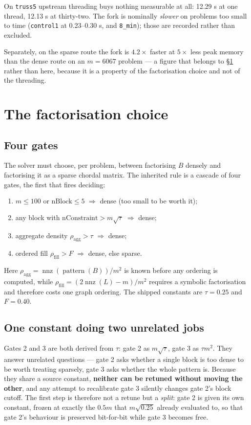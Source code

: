 \documentclass[11pt]{article}
\newcommand{\aggr}{\rho_{\mathrm{agg}}}
\newcommand{\rfill}{\rho_{\mathrm{fill}}}
\newcommand{\bMat}{B}
\newcommand{\code}[1]{\texttt{#1}}
\begin{document}
On \code{truss5} upstream threading buys nothing measurable at all: 12.29 s at one thread, 12.13 s
at thirty-two. The fork is nominally \emph{slower} on problems too small to time
(\code{control1} at 0.23--0.30 s, and \code{8\_min}); those are recorded rather than excluded.

Separately, on the sparse route the fork is $4.2\times$ faster at $5\times$ less peak memory than
the dense route on an $m=6067$ problem --- a figure that belongs to \S\ref{sec:chooser} rather than here, because
it is a property of the factorisation choice and not of the threading.

\section{The factorisation choice}
\label{sec:chooser}

\subsection{Four gates}

The solver must choose, per problem, between factorising $\bMat$ densely and factorising it as a
sparse chordal matrix. The inherited rule is a cascade of four gates, the first that fires
deciding:

\begin{enumerate}
  \item $m \le 100$ or $\text{nBlock} \le 5$ $\Rightarrow$ dense (too small to be worth it);
  \item any block with $\text{nConstraint} > m\sqrt{\tau}$ $\Rightarrow$ dense;
  \item aggregate density $\aggr > \tau$ $\Rightarrow$ dense;
  \item ordered fill $\rfill > F$ $\Rightarrow$ dense, else sparse.
\end{enumerate}

Here $\aggr = \operatorname{nnz}(\operatorname{pattern}(\bMat))/m^{2}$ is known before any
ordering is computed, while $\rfill = (2\operatorname{nnz}(L) - m)/m^{2}$ requires a symbolic
factorisation and therefore costs one graph ordering. The shipped constants are $\tau = 0.25$
and $F = 0.40$.

\subsection{One constant doing two unrelated jobs}

Gates 2 and 3 are both derived from $\tau$: gate 2 as $m\sqrt{\tau}$, gate 3 as $\tau m^{2}$.
They answer unrelated questions --- gate 2 asks whether a single block is too dense to be worth
treating sparsely, gate 3 asks whether the whole pattern is. Because they share a source
constant, \textbf{neither can be retuned without moving the other}, and any attempt to recalibrate
gate 3 silently changes gate 2's block cutoff. The first step is therefore not a retune but a
\emph{split}: gate 2 is given its own constant, frozen at exactly the $0.5m$ that $m\sqrt{0.25}$
already evaluated to, so that gate 2's behaviour is preserved bit-for-bit while gate 3 becomes
free.
\end{document}
